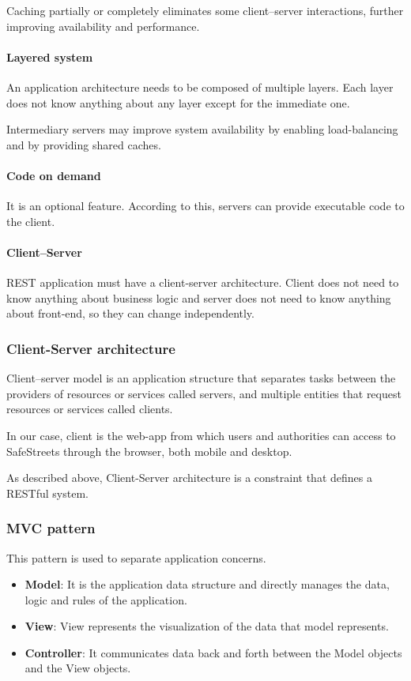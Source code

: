 Caching partially or completely eliminates some client–server interactions, further improving availability and performance.

\paragraph{Layered system}
An application architecture needs to be composed of multiple layers. Each layer does not know anything about any layer except for the immediate one. 

Intermediary servers may improve system availability by enabling load-balancing and by providing shared caches.

\paragraph{Code on demand}
It is an optional feature. According to this, servers can provide executable code to the client.

\paragraph{Client–Server}
REST application must have a client-server architecture. Client does not need to know anything about business logic and server does not need to know anything about front-end, so they can change independently.


\subsubsection{Client-Server architecture}
Client–server model is an application structure that separates tasks between the providers of resources or services called servers, and multiple entities that request resources or services called clients.

In our case, client is the web-app from which users and authorities can access to SafeStreets through the browser, both mobile and desktop.

As described above, Client-Server architecture is a constraint that defines a RESTful system.

\subsubsection{MVC pattern}
This pattern is used to separate application concerns.
\begin{itemize}
	\item \textbf{Model}: It is the application data structure and directly manages the data, logic and rules of the application.
	\item \textbf{View}: View represents the visualization of the data that model represents.
	\item \textbf{Controller}: It communicates data back and forth between the Model objects and the View objects.
\end{itemize}

